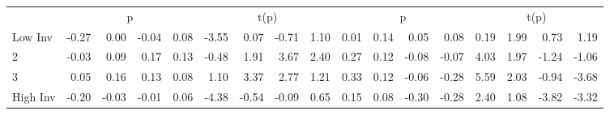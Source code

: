 \begin{table}[!ht]
\begin{tabular}{lrrrrrrrrrrrrrrrr}
  
     & \multicolumn{4}{c}{p} & \multicolumn{4}{c}{t(p)}  & \multicolumn{4}{c}{p} & \multicolumn{4}{c}{t(p)}   \\
     \cmidrule(r){2-5} \cmidrule(r){6-9}  \cmidrule(r){10-13} \cmidrule(r){14-17} 
    Low Inv  & -0.27  & 0.00  & -0.04  & 0.08  & -3.55  & 0.07  & -0.71  & 1.10  & 0.01  & 0.14  & 0.05  & 0.08  & 0.19  & 1.99  & 0.73  & 1.19   \\
    2  & -0.03  & 0.09  & 0.17  & 0.13  & -0.48  & 1.91  & 3.67  & 2.40  & 0.27  & 0.12  & -0.08  & -0.07  & 4.03  & 1.97  & -1.24  & -1.06   \\
    3  & 0.05  & 0.16  & 0.13  & 0.08  & 1.10  & 3.37  & 2.77  & 1.21  & 0.33  & 0.12  & -0.06  & -0.28  & 5.59  & 2.03  & -0.94  & -3.68   \\
    High Inv  & -0.20  & -0.03  & -0.01  & 0.06  & -4.38  & -0.54  & -0.09  & 0.65  & 0.15  & 0.08  & -0.30  & -0.28  & 2.40  & 1.08  & -3.82  & -3.32   \\
    
  
  \bottomrule
\end{tabular}
\label{tbl:32_Size_BM_Inv_B16}
\end{table}